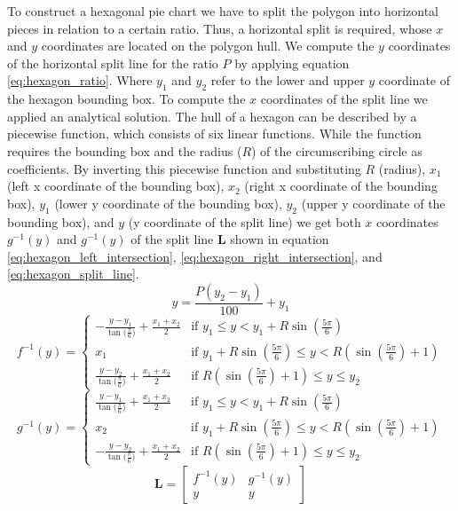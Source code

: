 		To construct a hexagonal pie chart we have to split the polygon into horizontal pieces in relation to a certain ratio. Thus, a horizontal split is required, whose $x$ and $y$ coordinates are located on the polygon hull. We compute the $y$ coordinates of the horizontal split line for the ratio $P$ by applying equation \ref{eq:hexagon_ratio}. Where $y_1$ and $y_2$ refer to the lower and upper $y$ coordinate of the hexagon bounding box. To compute the $x$ coordinates of the split line we applied an analytical solution. The hull of a hexagon can be described by a piecewise function, which consists of six linear functions. While the function requires the bounding box and the radius ($R$) of the circumscribing circle as coefficients. By inverting this piecewise function and substituting $R$ (radius), $x_1$ (left x coordinate of the bounding box), $x_2$ (right x coordinate of the bounding box), $y_1$ (lower y coordinate of the bounding box), $y_2$ (upper y coordinate of the bounding box), and $y$ (y coordinate of the split line) we get both $x$ coordinates $g^{-1}(y)$ and $g^{-1}(y)$ of the split line $\mathbf{L}$ shown in equation \ref{eq:hexagon_left_intersection}, \ref{eq:hexagon_right_intersection}, and \ref{eq:hexagon_split_line}.
		\begin{equation}
		\label{eq:hexagon_ratio}
			y = \frac{P(y_2-y_1)}{100} + y_1
		\end{equation}
		\begin{equation}
		\label{eq:hexagon_left_intersection}
			f^{-1}(y) =
			\begin{cases} 
				-\frac{y - y_1}{\tan{(\frac{\pi}{6}})} + \frac{x_1 + x_2}{2} & \text{if } y_1 \le y < y_1 + R\sin{(\frac{5\pi}{6})} \\
				x_1 & \text{if } y_1 + R\sin{(\frac{5\pi}{6})} \le y < R(\sin{(\frac{5\pi}{6})} + 1) \\
				\frac{y - y_2}{\tan{(\frac{\pi}{6}})} + \frac{x_1 + x_2}{2} & \text{if } R(\sin{(\frac{5\pi}{6})} + 1) \le y \le y_2
			\end{cases}
		\end{equation}
		\begin{equation}
		\label{eq:hexagon_right_intersection}
			g^{-1}(y) = 
			\begin{cases} 
				\frac{y - y_1}{\tan{(\frac{\pi}{6}})} + \frac{x_1 + x_2}{2} & \text{if } y_1 \le y < y_1 + R\sin{(\frac{5\pi}{6})} \\
				x_2 & \text{if } y_1 + R\sin{(\frac{5\pi}{6})} \le y < R(\sin{(\frac{5\pi}{6})} + 1) \\
				-\frac{y - y_2}{\tan{(\frac{\pi}{6}})} + \frac{x_1 + x_2}{2} & \text{if } R(\sin{(\frac{5\pi}{6})} + 1) \le y \le y_2
			\end{cases}
		\end{equation}
		\begin{equation}
		\label{eq:hexagon_split_line}
			\mathbf{L} =
			\begin{bmatrix}
				f^{-1}(y) & g^{-1}(y) \\
				y & y
			\end{bmatrix}
		\end{equation}

